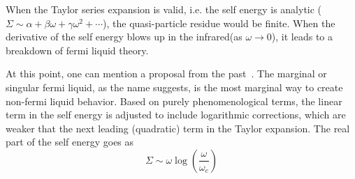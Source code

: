 \par
When the Taylor series expansion is valid, i.e. the self energy is analytic ($\Sigma \sim \alpha + \beta\omega + \gamma\omega^2 + \cdots$), the quasi-particle residue would be finite.
When the derivative of the self energy blows up in the infrared(as $\omega\xrightarrow{}0$), it leads to a breakdown of fermi liquid theory. 
\par
At this point, one can mention a proposal from the past~\cite{varma1989phenomenology,ruckenstein1991theory,varma1993towards,varma2002singular}. The marginal or singular fermi liquid, as the name suggests, is the most marginal way to create non-fermi liquid behavior. Based on purely phenomenological terms, the linear term in the self energy is adjusted to include logarithmic corrections, which are weaker that the next leading (quadratic) term in the Taylor expansion.  
The real part of the self energy goes as 
\begin{equation}
    \Sigma \sim \omega\log(\frac{\omega}{\omega_c})
\end{equation}
